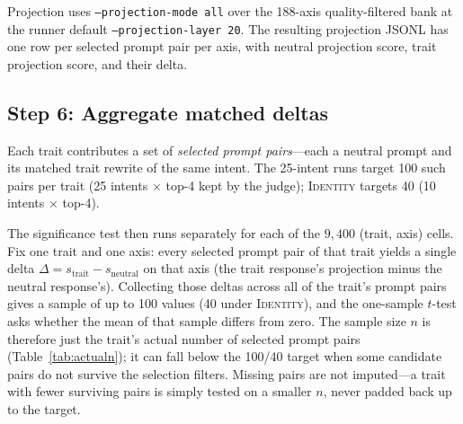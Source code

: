 \documentclass{article}
\begin{document}
Projection uses \texttt{--projection-mode all} over the 188-axis quality-filtered bank at the runner default \texttt{--projection-layer 20}. The resulting projection JSONL has one row per selected prompt pair per axis, with neutral projection score, trait projection score, and their delta.

\subsection{Step 6: Aggregate matched deltas}

Each trait contributes a set of \emph{selected prompt pairs}---each a neutral prompt and its matched trait rewrite of the same intent. The 25-intent runs target 100 such pairs per trait (25 intents $\times$ top-4 kept by the judge); \textsc{Identity} targets 40 (10 intents $\times$ top-4).

The significance test then runs separately for each of the $9{,}400$ (trait, axis) cells. Fix one trait and one axis: every selected prompt pair of that trait yields a single delta $\Delta=s_{\text{trait}}-s_{\text{neutral}}$ on that axis (the trait response's projection minus the neutral response's). Collecting those deltas across all of the trait's prompt pairs gives a sample of up to 100 values (40 under \textsc{Identity}), and the one-sample $t$-test asks whether the mean of that sample differs from zero. The sample size $n$ is therefore just the trait's actual number of selected prompt pairs (Table~\ref{tab:actualn}); it can fall below the 100/40 target when some candidate pairs do not survive the selection filters. Missing pairs are not imputed---a trait with fewer surviving pairs is simply tested on a smaller $n$, never padded back up to the target.
\end{document}

